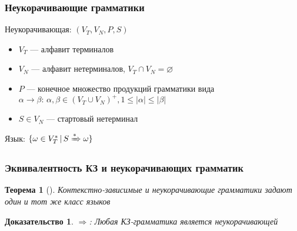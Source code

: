 \documentclass{beamer}
\newtheorem{rutheorem}{Теорема}
\newtheorem{ruproof}{Доказательство}
\newcommand{\derive}[0]{\xRightarrow[]{*}}
\begin{document}
\begin{frame}[fragile]
  \transwipe[direction=90]
  \frametitle{Неукорачивающие грамматики}

\begin{center}
    Неукорачивающая: $(V_T, V_N, P, S)$
\end{center}
  
  \begin{itemize}
    \item $V_T$ --- алфавит терминалов
    \item $V_N$ --- алфавит нетерминалов, $V_T \cap V_N = \varnothing$
    \item $P$ --- конечное множество продукций грамматики вида $\alpha \rightarrow \beta: \, \alpha, \beta \in (V_T \cup V_N)^+, 1 \leq |\alpha| \leq |\beta|$   
    \item $S \in V_N$ --- стартовый нетерминал
  \end{itemize}
  

\begin{center}
    Язык: $\{ \omega \in V_T^* \, | \, S \derive \omega\}$   
\end{center}
\end{frame}


\begin{frame}[fragile]
  \transwipe[direction=90]
  \frametitle{Эквивалентность КЗ и неукорачивающих грамматик}
\begin{rutheorem}[]
  Контекстно-зависимые и неукорачивающие грамматики задают один и тот же класс языков
\end{rutheorem}

\begin{ruproof}
$\Rightarrow$: Любая КЗ-грамматика является неукорачивающей
\end{ruproof}

\end{frame}
\end{document}
